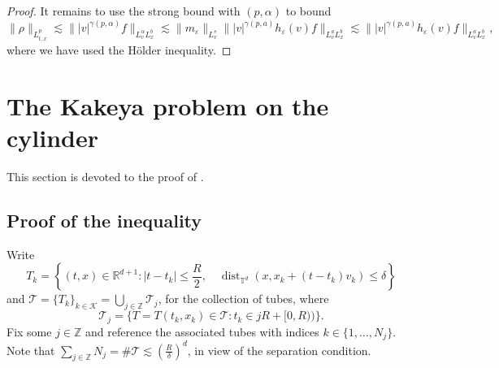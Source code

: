 \documentclass[11pt,a4paper,reqno]{amsart}
\theoremstyle{plain}
\theoremstyle{remark}
\begin{document}
\begin{proof}
It remains to use the strong bound with $(p,\alpha)$ to bound 
\[
    \|\rho\|_{L^p_{t,x}} \lesssim
    \||v|^{\gamma(p,\alpha)}f\|_{L^\alpha_vL^b_x} \lesssim \|m_{\varepsilon}\|_{L^s_v}\||v|^{\gamma(p,a)}h_{\varepsilon}(v)f\|_{L^a_vL^b_x} \lesssim \||v|^{\gamma(p,a)}h_{\varepsilon}(v)f\|_{L^a_vL^b_x},
\]
where we have used the Hölder inequality.
\end{proof}

\section{The Kakeya problem on the cylinder}

\label{section_proof_Kakeya}

This section is devoted to the proof of .

\subsection{Proof of the inequality}

Write 
\[ 
    T_k = \left\{(t,x) \in\mathbb{R}^{d+1} : |t-t_k| \leq \frac{R}{2}, \quad  \operatorname{dist}_{\mathbb{T}^d}(x,x_k +(t-t_k)v_k) \leq \delta \right\}
\]
and $\mathcal{T}=\{T_k\}_{k\in\mathcal{K}} = \bigcup_{j\in\mathbb{Z}} \mathcal{T}_j$, for the collection of tubes, where 
\[
    \mathcal{T}_j = \{T=T(t_k,x_k) \in \mathcal{T} : t_k \in jR+[0,R))\}.
\]
Fix some $j\in \mathbb{Z}$ and reference the associated tubes with indices $k \in \{1, \dots, N_j\}$. Note that $\sum_{j \in \mathbb{Z}} N_j = \# \mathcal{T} \lesssim \left(\frac{R}{\delta}\right)^d$, in view of the separation condition.
\end{document}
